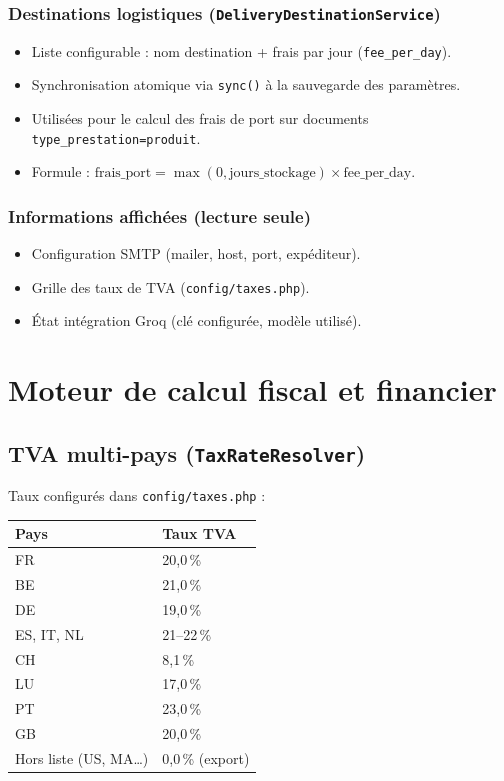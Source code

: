 \documentclass[11pt,a4paper]{report}
\newcommand{\svc}[1]{\texttt{\small #1}}
\begin{document}
\subsection{Destinations logistiques (\svc{DeliveryDestinationService})}

\begin{itemize}[leftmargin=*]
    \item Liste configurable : nom destination + frais par jour (\texttt{fee\_per\_day}).
    \item Synchronisation atomique via \texttt{sync()} à la sauvegarde des paramètres.
    \item Utilisées pour le calcul des frais de port sur documents \texttt{type\_prestation=produit}.
    \item Formule : $\text{frais\_port} = \max(0, \text{jours\_stockage}) \times \text{fee\_per\_day}$.
\end{itemize}

\subsection{Informations affichées (lecture seule)}

\begin{itemize}[leftmargin=*]
    \item Configuration SMTP (mailer, host, port, expéditeur).
    \item Grille des taux de TVA (\texttt{config/taxes.php}).
    \item État intégration Groq (clé configurée, modèle utilisé).
\end{itemize}

\chapter{Moteur de calcul fiscal et financier}

\section{TVA multi-pays (\svc{TaxRateResolver})}

Taux configurés dans \texttt{config/taxes.php} :

\begin{center}
\begin{tabular}{@{}ll@{}}
\toprule
\textbf{Pays} & \textbf{Taux TVA} \\
\midrule
FR & 20{,}0\,\% \\
BE & 21{,}0\,\% \\
DE & 19{,}0\,\% \\
ES, IT, NL & 21--22\,\% \\
CH & 8{,}1\,\% \\
LU & 17{,}0\,\% \\
PT & 23{,}0\,\% \\
GB & 20{,}0\,\% \\
Hors liste (US, MA\ldots) & 0{,}0\,\% (export) \\
\bottomrule
\end{tabular}
\end{center}
\end{document}
